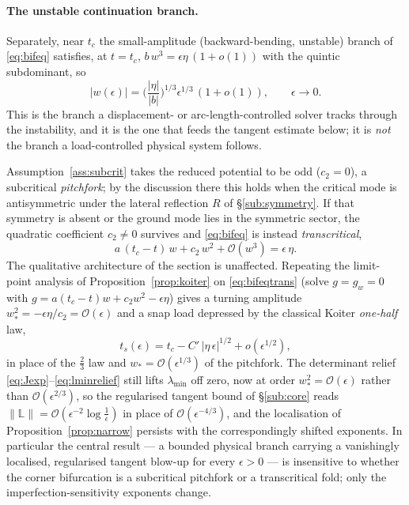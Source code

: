 \paragraph{The unstable continuation branch.}
Separately, near $t_c$ the small-amplitude (backward-bending, unstable) branch of \eqref{eq:bifeq} satisfies, at
$t=t_c$, $b\,w^3=\epsilon\eta\,(1+o(1))$ with the quintic subdominant, so
\begin{equation}
    \label{eq:wscale}
    |w(\epsilon)| = \Big(\frac{|\eta|}{|b|}\Big)^{1/3}\epsilon^{1/3}\,(1+o(1)), \qquad \epsilon\to0 .
\end{equation}
This is the branch a displacement- or arc-length-controlled solver tracks through the instability, and it is the one
that feeds the tangent estimate below; it is \emph{not} the branch a load-controlled physical system follows.

\begin{remark}
    \label{rem:transcritical}
    Assumption~\ref{ass:subcrit} takes the reduced potential to be odd ($c_2=0$), a subcritical \emph{pitchfork}; by the
    discussion there this holds when the critical mode is antisymmetric under the lateral reflection $R$ of
    \S\ref{sub:symmetry}. If that symmetry is absent or the ground mode lies in the symmetric sector, the quadratic
    coefficient $c_2\neq0$ survives and \eqref{eq:bifeq} is instead \emph{transcritical},
    \begin{equation}
        \label{eq:bifeqtrans}
        a\,(t_c-t)\,w + c_2\,w^2 + \mathcal{O}(w^3) = \epsilon\,\eta .
    \end{equation}
    The qualitative architecture of the section is unaffected. Repeating the limit-point analysis of
    Proposition~\ref{prop:koiter} on \eqref{eq:bifeqtrans} (solve $g=g_w=0$ with $g=a(t_c-t)w+c_2w^2-\epsilon\eta$) gives
    a turning amplitude $w_\ast^2=-\epsilon\eta/c_2=\mathcal{O}(\epsilon)$ and a snap load depressed by the classical
    Koiter \emph{one-half} law,
    \begin{equation}
        t_s(\epsilon)=t_c-C'\,|\eta\,\epsilon|^{1/2}+o(\epsilon^{1/2}),
    \end{equation}
    in place of the $\tfrac23$ law and $w_\ast=\mathcal{O}(\epsilon^{1/3})$ of the pitchfork. The determinant relief
    \eqref{eq:Jexp}--\eqref{eq:lminrelief} still lifts $\lambda_{\min}$ off zero, now at order
    $w_\ast^2=\mathcal{O}(\epsilon)$ rather than $\mathcal{O}(\epsilon^{2/3})$, so the regularised tangent bound of
    \S\ref{sub:core} reads $\|\mathbb{L}\|=\mathcal{O}(\epsilon^{-2}\log\tfrac1\epsilon)$ in place of
    $\mathcal{O}(\epsilon^{-4/3})$, and the localisation of Proposition~\ref{prop:narrow} persists with the
    correspondingly shifted exponents. In particular the central result --- a bounded physical branch carrying a
    vanishingly localised, regularised tangent blow-up for every $\epsilon>0$ --- is insensitive to whether the corner
    bifurcation is a subcritical pitchfork or a transcritical fold; only the imperfection-sensitivity exponents change.
\end{remark}

